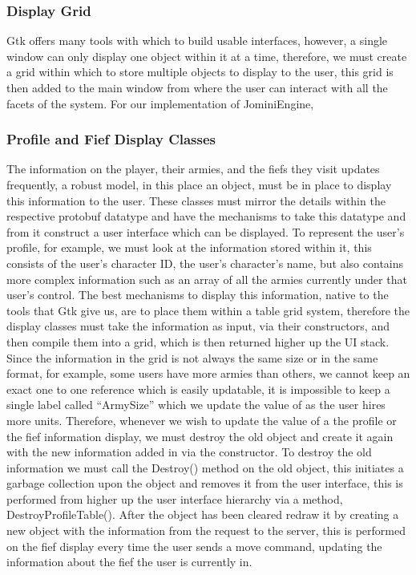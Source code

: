 \documentclass{article}
\begin{document}
\subsubsection{Display Grid}
Gtk offers many tools with which to build usable interfaces, however, a single window can only display one object within it at a time, therefore, we must create a grid within which to store multiple objects to display to the user, this grid is then added to the main window from where the user can interact with all the facets of the system. For our implementation of JominiEngine, 

\subsubsection{Profile and Fief Display Classes}

The information on the player, their armies, and the fiefs they visit updates frequently, a robust model, in this place an object, must be in place to display this information to the user. These classes must mirror the details within the respective protobuf datatype and have the mechanisms to take this datatype and from it construct a user interface which can be displayed. To represent the user’s profile, for example, we must look at the information stored within it, this consists of the user’s character ID, the user’s character’s name, but also contains more complex information such as an array of all the armies currently under that user’s control. The best mechanisms to display this information, native to the tools that Gtk give us, are to place them within a table grid system, therefore the display classes must take the information as input, via their constructors, and then compile them into a grid, which is then returned higher up the UI stack. Since the information in the grid is not always the same size or in the same format, for example, some users have more armies than others, we cannot keep an exact one to one reference which is easily updatable, it is impossible to keep a single label called “ArmySize” which we update the value of as the user hires more units. Therefore, whenever we wish to update the value of a the profile or the fief information display, we must destroy the old object and create it again with the new information added in via the constructor. To destroy the old information we must call the Destroy() method on the old object, this initiates a garbage collection upon the object and removes it from the user interface, this is performed from higher up the user interface hierarchy via a method, DestroyProfileTable(). After the object has been cleared redraw it by creating a new object with the information from the request to the server, this is performed on the fief display every time the user sends a move command, updating the information about the fief the user is currently in.
\end{document}
